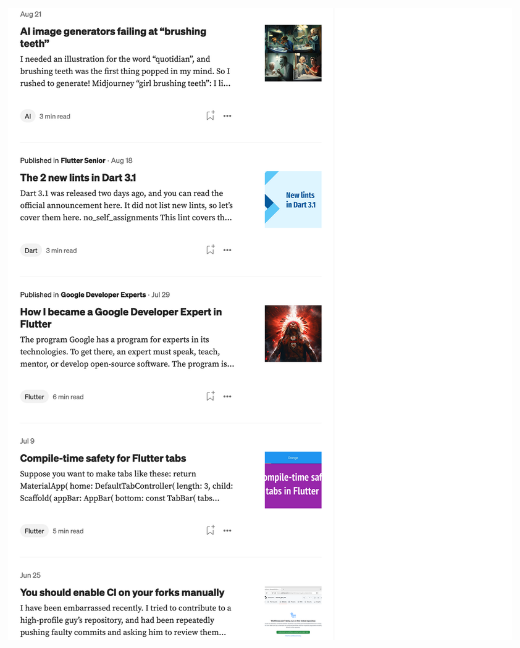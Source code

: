 \Continuing
\begin{center}
    \includegraphics[width=40em]{medium-articles-p4}
\end{center}
\WillContinue
\pagebreak

